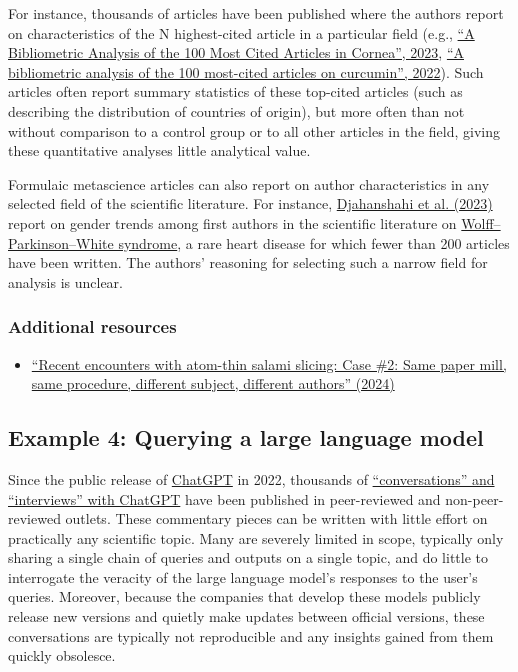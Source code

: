 \documentclass[letterpaper, 12pt]{article}
\begin{document}
For instance, thousands of articles have been published where the authors report on characteristics of the N highest-cited article in a particular field (e.g., \href{https://doi.org/10.1097/coa.0000000000000021}{``A Bibliometric Analysis of the 100 Most Cited Articles in Cornea'', 2023}, \href{https://doi.org/10.3389/fphar.2022.963032}{``A bibliometric analysis of the 100 most-cited articles on curcumin'', 2022}). Such articles often report summary statistics of these top-cited articles (such as describing the distribution of countries of origin), but more often than not without comparison to a control group or to all other articles in the field, giving these quantitative analyses little analytical value.

Formulaic metascience articles can also report on author characteristics in any selected field of the scientific literature. For instance, \href{https://doi.org/10.7759/cureus.47208}{Djahanshahi et al. (2023)} report on gender trends among first authors in the scientific literature on \href{https://en.wikipedia.org/wiki/Wolff%E2%80%93Parkinson%E2%80%93White\_syndrome}{Wolff–Parkinson–White syndrome}, a rare heart disease for which fewer than 200 articles have been written. The authors' reasoning for selecting such a narrow field for analysis is unclear.

\subsubsection*{Additional resources}

\begin{itemize}
    \setlength\itemsep{-0.5em}
    \item \href{https://reeserichardson.blog/2024/12/30/recent-encounters-with-atom-thin-salami-slicing/}{``Recent encounters with atom-thin salami slicing: Case \#2: Same paper mill, same procedure, different subject, different authors'' (2024)}
\end{itemize}

\subsection*{Example 4: Querying a large language model}

Since the public release of \href{https://en.wikipedia.org/wiki/ChatGPT}{ChatGPT} in 2022, thousands of \href{https://scholar.google.com/scholar?start=10&q="conversation+with+chatgpt"+OR+"interview+with+chatgpt"&hl=en}{``conversations'' and ``interviews'' with ChatGPT} have been published in peer-reviewed and non-peer-reviewed outlets. These commentary pieces can be written with little effort on practically any scientific topic. Many are severely limited in scope, typically only sharing a single chain of queries and outputs on a single topic, and do little to interrogate the veracity of the large language model's responses to the user's queries. Moreover, because the companies that develop these models publicly release new versions and quietly make updates between official versions, these conversations are typically not reproducible and any insights gained from them quickly obsolesce.
\end{document}
